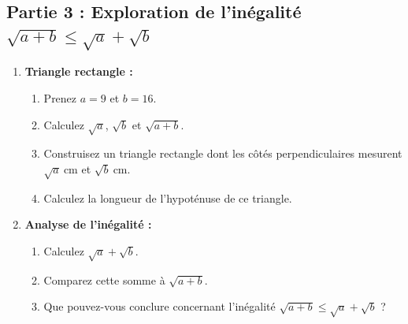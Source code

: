 \documentclass{article}
\begin{document}
\subsection*{Partie 3 : Exploration de l'inégalité $\sqrt{a + b} \leq \sqrt{a} + \sqrt{b}$}

\begin{enumerate}
    \item \textbf{Triangle rectangle :}
    \begin{enumerate}
        \item Prenez $a = 9$ et $b = 16$.
        \item Calculez $\sqrt{a}$, $\sqrt{b}$ et $\sqrt{a + b}$.
        \item Construisez un triangle rectangle dont les côtés perpendiculaires mesurent $\sqrt{a}~\text{cm}$ et $\sqrt{b}~\text{cm}$.
        \item Calculez la longueur de l'hypoténuse de ce triangle.
    \end{enumerate}
    \item \textbf{Analyse de l'inégalité :}
    \begin{enumerate}
        \item Calculez $\sqrt{a} + \sqrt{b}$.
        \item Comparez cette somme à $\sqrt{a + b}$.
        \item Que pouvez-vous conclure concernant l'inégalité $\sqrt{a + b} \leq \sqrt{a} + \sqrt{b}$ ?
    \end{enumerate}
\end{enumerate}
\end{document}
